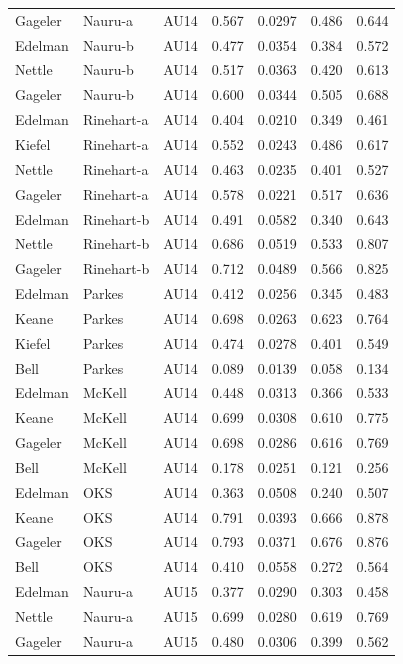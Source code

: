 \documentclass{monashthesis}
\begin{document}
\begin{center}
\begin{longtable}{lllllll}
Gageler & Nauru-a & AU14 & 0.567 & 0.0297 & 0.486 & 0.644 \\
Edelman & Nauru-b & AU14 & 0.477 & 0.0354 & 0.384 & 0.572 \\
Nettle & Nauru-b & AU14 & 0.517 & 0.0363 & 0.420 & 0.613 \\
Gageler & Nauru-b & AU14 & 0.600 & 0.0344 & 0.505 & 0.688 \\
Edelman & Rinehart-a & AU14 & 0.404 & 0.0210 & 0.349 & 0.461 \\
Kiefel & Rinehart-a & AU14 & 0.552 & 0.0243 & 0.486 & 0.617 \\
Nettle & Rinehart-a & AU14 & 0.463 & 0.0235 & 0.401 & 0.527 \\
Gageler & Rinehart-a & AU14 & 0.578 & 0.0221 & 0.517 & 0.636 \\
Edelman & Rinehart-b & AU14 & 0.491 & 0.0582 & 0.340 & 0.643 \\
Nettle & Rinehart-b & AU14 & 0.686 & 0.0519 & 0.533 & 0.807 \\
Gageler & Rinehart-b & AU14 & 0.712 & 0.0489 & 0.566 & 0.825 \\
Edelman & Parkes & AU14 & 0.412 & 0.0256 & 0.345 & 0.483 \\
Keane & Parkes & AU14 & 0.698 & 0.0263 & 0.623 & 0.764 \\
Kiefel & Parkes & AU14 & 0.474 & 0.0278 & 0.401 & 0.549 \\
Bell & Parkes & AU14 & 0.089 & 0.0139 & 0.058 & 0.134 \\
Edelman & McKell & AU14 & 0.448 & 0.0313 & 0.366 & 0.533 \\
Keane & McKell & AU14 & 0.699 & 0.0308 & 0.610 & 0.775 \\
Gageler & McKell & AU14 & 0.698 & 0.0286 & 0.616 & 0.769 \\
Bell & McKell & AU14 & 0.178 & 0.0251 & 0.121 & 0.256 \\
Edelman & OKS & AU14 & 0.363 & 0.0508 & 0.240 & 0.507 \\
Keane & OKS & AU14 & 0.791 & 0.0393 & 0.666 & 0.878 \\
Gageler & OKS & AU14 & 0.793 & 0.0371 & 0.676 & 0.876 \\
Bell & OKS & AU14 & 0.410 & 0.0558 & 0.272 & 0.564 \\
Edelman & Nauru-a & AU15 & 0.377 & 0.0290 & 0.303 & 0.458 \\
Nettle & Nauru-a & AU15 & 0.699 & 0.0280 & 0.619 & 0.769 \\
Gageler & Nauru-a & AU15 & 0.480 & 0.0306 & 0.399 & 0.562 \\

\end{longtable}
\end{center}
\end{document}

